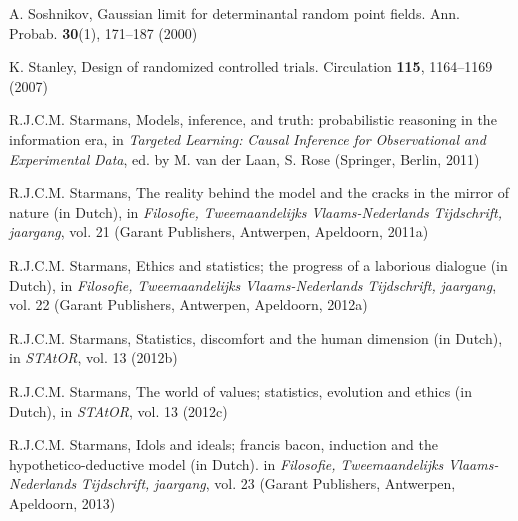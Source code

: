 \begin{list}{}{\setlength{\leftmargin}{2.1em}\setlength{\labelwidth}{0pt}
  \setlength{\labelsep}{0pt}\setlength{\itemindent}{-2.1em}
  \setlength{\parsep}{0pt}\setlength{\itemsep}{2pt}\setlength{\topsep}{0pt}}
\item\label{refentry:REF369}A. Soshnikov, Gaussian limit for determinantal random point fields. Ann. Probab. \textbf{30}(1), 171--187 (2000)\label{refend:REF369}
\item\label{refentry:REF370}K. Stanley, Design of randomized controlled trials. Circulation \textbf{115}, 1164--1169 (2007)\label{refend:REF370}
\item\label{refentry:REF371}R.J.C.M. Starmans, Models, inference, and truth: probabilistic reasoning in the information era, in \textit{Targeted} \textit{Learning:} \textit{Causal} \textit{Inference} \textit{for} \textit{Observational} \textit{and} \textit{Experimental} \textit{Data}, ed. by M. van der Laan, S. Rose (Springer, Berlin, 2011)\label{refend:REF371}
\item\label{refentry:REF372}R.J.C.M. Starmans, The reality behind the model and the cracks in the mirror of nature (in Dutch), in \textit{Filosofie,} \textit{Tweemaandelijks} \textit{Vlaams-Nederlands} \textit{Tijdschrift,} \textit{jaargang}, vol. 21 (Garant Publishers, Antwerpen, Apeldoorn, 2011a)\label{refend:REF372}
\item\label{refentry:REF373}R.J.C.M. Starmans, Ethics and statistics; the progress of a laborious dialogue (in Dutch), in \textit{Filosofie,} \textit{Tweemaandelijks} \textit{Vlaams-Nederlands} \textit{Tijdschrift,} \textit{jaargang}, vol. 22 (Garant Publishers, Antwerpen, Apeldoorn, 2012a)\label{refend:REF373}
\item\label{refentry:REF374}R.J.C.M. Starmans, Statistics, discomfort and the human dimension (in Dutch), in \textit{STAtOR}, vol. 13 (2012b)\label{refend:REF374}
\item\label{refentry:REF375}R.J.C.M. Starmans, The world of values; statistics, evolution and ethics (in Dutch), in \textit{STAtOR}, vol. 13 (2012c)\label{refend:REF375}
\item\label{refentry:REF376}R.J.C.M. Starmans, Idols and ideals; francis bacon, induction and the hypothetico-deductive model (in Dutch). in \textit{Filosofie,} \textit{Tweemaandelijks} \textit{Vlaams-Nederlands} \textit{Tijdschrift,} \textit{jaargang}, vol. 23 (Garant Publishers, Antwerpen, Apeldoorn, 2013)\label{refend:REF376}

\end{list}
